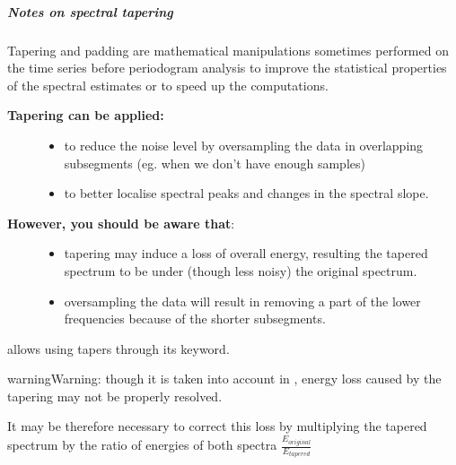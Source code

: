 \documentclass[letterpaper,10pt,english]{sphinxmanual}
\begin{document}
\subparagraph{Notes on spectral tapering}
\label{altimetry.tools.spectrum:notes-on-spectral-tapering}
Tapering and padding are mathematical manipulations sometimes performed on the time series before periodogram analysis to improve the statistical properties of the spectral estimates or to speed up the computations.
\begin{description}
\item[{\textbf{Tapering can be applied:}}] \leavevmode\begin{itemize}
\item {} 
to reduce the noise level by oversampling the data in overlapping subsegments (eg. when we don't have enough samples)

\item {} 
to better localise spectral peaks and changes in the spectral slope.

\end{itemize}

\item[{\textbf{However, you should be aware that}:}] \leavevmode\begin{itemize}
\item {} 
tapering may induce a loss of overall energy, resulting the tapered spectrum to be under (though less noisy) the original spectrum.

\item {} 
oversampling the data will result in removing a part of the lower frequencies because of the shorter subsegments.

\end{itemize}

\end{description}

{\hyperref[altimetry.tools.spectrum:altimetry.tools.spectrum.preprocess]{}} allows using tapers through its  keyword.

\begin{notice}{warning}{Warning:}
though it is taken into account in {\hyperref[altimetry.tools.spectrum:altimetry.tools.spectrum.spectral_analysis]{}}, energy loss caused by the tapering may not be properly resolved.

It may be therefore necessary to correct this loss by multiplying the tapered spectrum by the ratio of energies of both spectra $\frac{E_{original}}{E_{tapered}}$
\end{notice}
\end{document}
